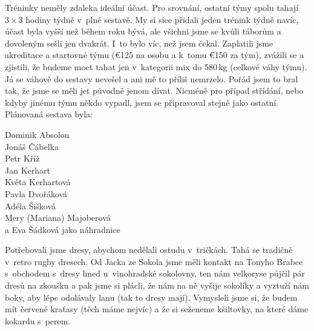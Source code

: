 \documentclass[11pt]{article}
\begin{document}
Tréninky neměly zdaleka ideální účast. Pro srovnání, ostatní týmy spolu tahají $3\times3$ hodiny týdně v~plné sestavě. My si sice přidali jeden trénink týdně navíc, účast byla vyšší než během roku bývá, ale všichni jsme se kvůli táborům a dovoleným sešli jen dvakrát. I~to bylo víc, než jsem čekal. Zaplatili jsme akreditace a startovné týmu (€125 na osobu a k~tomu €150 za tým), zvážili se a zjistili, že budeme moct tahat jen v~kategorii mix do 580\,kg (celkové váhy týmu). Já se váhově do sestavy nevešel a ani mě to příliš nemrzelo. Pořád jsem to bral tak, že jsme se měli jet původně jenom dívat. Nicméně pro případ střídání, nebo kdyby jinému týmu někdo vypadl, jsem se připravoval stejně jako ostatní. Plánovaná sestava byla:
\begin{center}
Dominik Absolon \\
Jonáš Čábelka \\
Petr Kříž \\
Jan Kerhart \\
Květa Kerhartová \\
Pavla Dvořáková \\
Adéla Šišková \\
Mery (Mariana) Majoberová \\
a Eva Šádková jako náhradnice
\end{center}

Potřebovali jsme dresy, abychom nedělali ostudu v~tričkách. Tahá se tradičně v~retro rugby dresech. Od Jacka ze Sokola jsme měli kontakt na Tonyho Brabce s~obchodem s~dresy hned u~vinohradské sokolovny, ten nám velkoryse půjčil pár dresů na zkoušku a pak jsme si plácli, že nám na ně vyšije sokolíky a vyztuží nám boky, aby lépe odolávaly lanu (tak to dresy mají). Vymysleli jsme si, že budem mít červené kraťasy (těch máme nejvíc) a že si seženeme kšiltovky, na které dáme kokardu s~perem.
\end{document}
